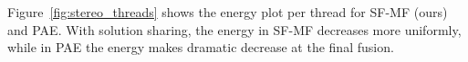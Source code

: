 %
%
%
Figure~\ref{fig:stereo_threads} shows the energy plot per thread for
SF-MF (ours) and PAE. With solution sharing, the energy in SF-MF
decreases more uniformly, while in PAE the energy makes dramatic
decrease at the final fusion.
%

